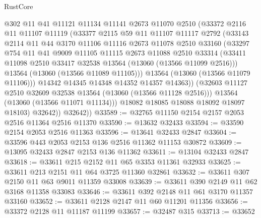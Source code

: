 \begin{lexlean}{RustCore}
\begin{coremodule}
                @302
                @11
                @41
                @11121
                @11134
                @11141
                @2673
                @11070
                @2510
                (@33372
                  @2116
                  @11
                  @11107
                  @11119
                  (@33377
                    @2115
                    @59
                    @11
                    @11107
                    @11117
                    @2792
                    (@33143
                      @2114
                      @11
                      @44
                      @3170
                      @11106
                      @11116
                      @2673
                      @11078
                      @2510
                      @33160
                      (@33297
                        @754
                        @11
                        @41
                        @9009
                        @11105
                        @11115
                        @2673
                        @11088
                        @2510
                        @33314
                        (@33411 @11098 @2510 @33417 @32538 @13564 (@13060 (@13566 @11099 @2516)))
                        @13564
                        (@13060 (@13566 @11089 @11105)))
                      @13564
                      (@13060 (@13566 @11079 @11106)))
                    @14342
                    @14345
                    @14348
                    @14352
                    @14357
                    @14363))
                (@32603 @11127 @2510 @32609 @32538 @13564 (@13060 (@13566 @11128 @2516)))
                @13564
                (@13060 (@13566 @11071 @11134)))
              @18082
              @18085
              @18088
              @18092
              @18097
              @18103)
            @32642))
        @32642))
@33589 := @32765 @11150 @2154 @2157 @2053 @2516 @11364 @2516 @11370
@33590 := @13632 @32433
@33594 := @33590 @2154 @2053 @2516 @11363
@33596 := @13641 @32433 @2847
@33604 := @33596 @443 @2053 @2153 @136 @2516 @11362 @11153 @30872
@33609 := @13095 @32433 @2847 @2153 @136 @11362
@33611 := @13104 @32433 @2847
@33618 := @33611 @215 @2152 @11 @65 @3353 @11361 @32933
@33625 := @33611 @213 @2151 @11 @64 @3725 @11360 @32861
@33632 := @33611 @307 @2150 @11 @63 @9011 @11359 @33008
@33639 := @33611 @390 @2149 @11 @62 @3168 @11358 @33083
@33646 := @33611 @392 @2148 @11 @61 @3170 @11357 @33160
@33652 := @33611 @2128 @2147 @11 @60 @11201 @11356
@33656 := @33372 @2128 @11 @11187 @11199
@33657 := @32487 @315
@33713 := @33652

\end{coremodule}
\end{lexlean}
